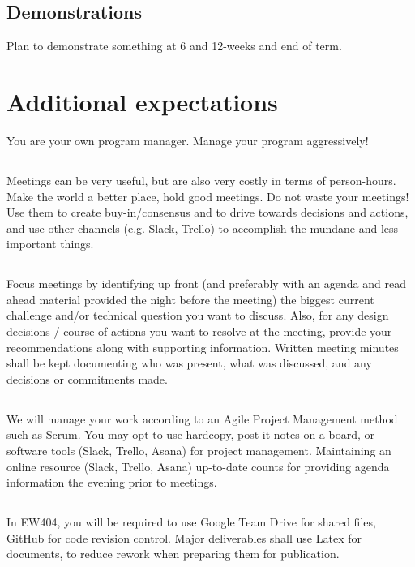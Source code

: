 \documentclass[10pt,courier]{navymemo}
\begin{document}
\subsection{Demonstrations} Plan to demonstrate something at 6 and 12-weeks and end of term. 

\section{Additional expectations} You are your own program manager. Manage your program aggressively!
\subsection{} Meetings can be very useful, but are also very costly in terms of person-hours.  Make the world a better place, hold good meetings.  Do not waste your meetings! Use them to create buy-in/consensus and to drive towards decisions and actions, and use other channels (e.g. Slack, Trello) to accomplish the mundane and less important things.
\subsection{} Focus meetings by identifying up front (and preferably with an agenda and read ahead material provided the night before the meeting) the biggest current challenge and/or technical question you want to discuss. Also, for any design decisions / course of actions you want to resolve at the meeting, provide your recommendations along with supporting information. Written meeting minutes shall be kept documenting who was present, what was discussed, and any decisions or commitments made.  
\subsection{} We will manage your work according to an Agile Project Management method such as Scrum. You may opt to use hardcopy, post-it notes on a board, or software tools (Slack, Trello, Asana) for project management.   Maintaining an online resource (Slack, Trello, Asana) up-to-date counts for providing agenda information the evening prior to meetings. 
\subsection{} In EW404, you will be required to use Google Team Drive for shared files, GitHub for code revision control. Major deliverables shall use Latex for documents, to reduce rework when preparing them for publication.
\end{document}
